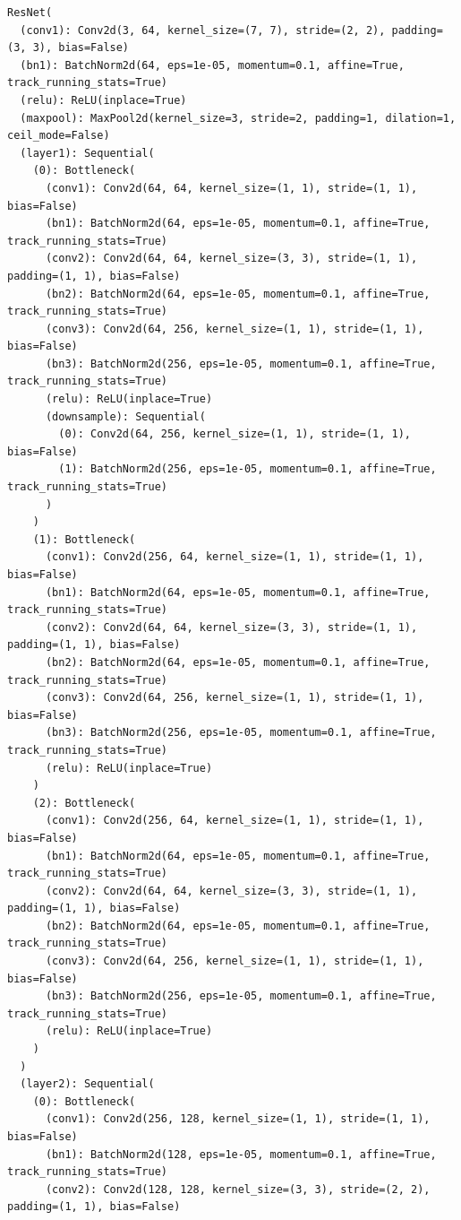 \documentclass{article}
\begin{document}
\begin{verbatim}
ResNet(
  (conv1): Conv2d(3, 64, kernel_size=(7, 7), stride=(2, 2), padding=(3, 3), bias=False)
  (bn1): BatchNorm2d(64, eps=1e-05, momentum=0.1, affine=True, track_running_stats=True)
  (relu): ReLU(inplace=True)
  (maxpool): MaxPool2d(kernel_size=3, stride=2, padding=1, dilation=1, ceil_mode=False)
  (layer1): Sequential(
    (0): Bottleneck(
      (conv1): Conv2d(64, 64, kernel_size=(1, 1), stride=(1, 1), bias=False)
      (bn1): BatchNorm2d(64, eps=1e-05, momentum=0.1, affine=True, track_running_stats=True)
      (conv2): Conv2d(64, 64, kernel_size=(3, 3), stride=(1, 1), padding=(1, 1), bias=False)
      (bn2): BatchNorm2d(64, eps=1e-05, momentum=0.1, affine=True, track_running_stats=True)
      (conv3): Conv2d(64, 256, kernel_size=(1, 1), stride=(1, 1), bias=False)
      (bn3): BatchNorm2d(256, eps=1e-05, momentum=0.1, affine=True, track_running_stats=True)
      (relu): ReLU(inplace=True)
      (downsample): Sequential(
        (0): Conv2d(64, 256, kernel_size=(1, 1), stride=(1, 1), bias=False)
        (1): BatchNorm2d(256, eps=1e-05, momentum=0.1, affine=True, track_running_stats=True)
      )
    )
    (1): Bottleneck(
      (conv1): Conv2d(256, 64, kernel_size=(1, 1), stride=(1, 1), bias=False)
      (bn1): BatchNorm2d(64, eps=1e-05, momentum=0.1, affine=True, track_running_stats=True)
      (conv2): Conv2d(64, 64, kernel_size=(3, 3), stride=(1, 1), padding=(1, 1), bias=False)
      (bn2): BatchNorm2d(64, eps=1e-05, momentum=0.1, affine=True, track_running_stats=True)
      (conv3): Conv2d(64, 256, kernel_size=(1, 1), stride=(1, 1), bias=False)
      (bn3): BatchNorm2d(256, eps=1e-05, momentum=0.1, affine=True, track_running_stats=True)
      (relu): ReLU(inplace=True)
    )
    (2): Bottleneck(
      (conv1): Conv2d(256, 64, kernel_size=(1, 1), stride=(1, 1), bias=False)
      (bn1): BatchNorm2d(64, eps=1e-05, momentum=0.1, affine=True, track_running_stats=True)
      (conv2): Conv2d(64, 64, kernel_size=(3, 3), stride=(1, 1), padding=(1, 1), bias=False)
      (bn2): BatchNorm2d(64, eps=1e-05, momentum=0.1, affine=True, track_running_stats=True)
      (conv3): Conv2d(64, 256, kernel_size=(1, 1), stride=(1, 1), bias=False)
      (bn3): BatchNorm2d(256, eps=1e-05, momentum=0.1, affine=True, track_running_stats=True)
      (relu): ReLU(inplace=True)
    )
  )
  (layer2): Sequential(
    (0): Bottleneck(
      (conv1): Conv2d(256, 128, kernel_size=(1, 1), stride=(1, 1), bias=False)
      (bn1): BatchNorm2d(128, eps=1e-05, momentum=0.1, affine=True, track_running_stats=True)
      (conv2): Conv2d(128, 128, kernel_size=(3, 3), stride=(2, 2), padding=(1, 1), bias=False)

\end{verbatim}
\end{document}
